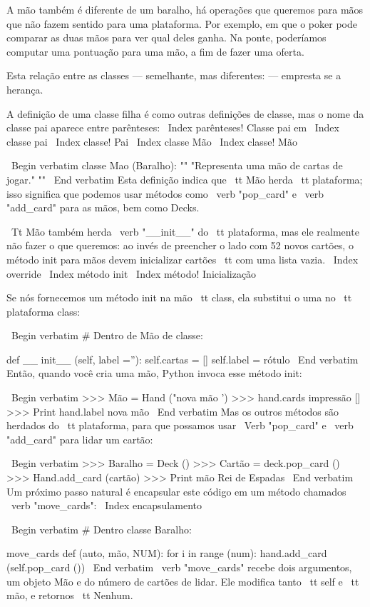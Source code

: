 \documentclass[10pt]{book}
\begin{document}
\begin {itemize}
{{{{{{{{{{{{{{{{A mão também é diferente de um baralho, há operações que queremos para
mãos que não fazem sentido para uma plataforma. Por exemplo, em que o poker
pode comparar as duas mãos para ver qual deles ganha. Na ponte, poderíamos
computar uma pontuação para uma mão, a fim de fazer uma oferta.

Esta relação entre as classes --- semelhante, mas diferentes: --- empresta
se a herança.  

A definição de uma classe filha é como outras definições de classe,
mas o nome da classe pai aparece entre parênteses:
\ Index {parênteses! Classe pai em}
\ Index {classe pai}
\ Index {classe! Pai}
\ Index {classe Mão}
\ Index {classe! Mão}

\ Begin {verbatim}
classe Mao (Baralho):
    "" "Representa uma mão de cartas de jogar." ""
\ End {verbatim}
%
Esta definição indica que {\ tt Mão} herda {\ tt plataforma};
isso significa que podemos usar métodos como \ verb "pop_card" e \ verb "add_card"
para as mãos, bem como Decks.

{\ Tt Mão} também herda \ verb "__init__" do {\ tt plataforma}, mas
ele realmente não fazer o que queremos: ao invés de preencher o lado
com 52 novos cartões, o método init para mãos devem inicializar
{cartões \ tt} com uma lista vazia.
\ Index {override}
\ Index {método init}
\ Index {método! Inicialização}

Se nós fornecemos um método init na mão {\ tt} class, ela substitui o
uma no {\ tt plataforma} class:

\ Begin {verbatim}
# Dentro de Mão de classe:

    def __ init__ (self, label =''):
        self.cartas = []
        self.label = rótulo
\ End {verbatim}
%
Então, quando você cria uma mão, Python invoca esse método init:

\ Begin {verbatim}
>>> Mão = Hand ("nova mão ')
>>> hand.cards impressão
[]
>>> Print hand.label
nova mão
\ End {verbatim}
%
Mas os outros métodos são herdados do {\ tt plataforma}, para que possamos usar
\ Verb "pop_card" e \ verb "add_card" para lidar um cartão:

\ Begin {verbatim}
>>> Baralho = Deck ()
>>> Cartão = deck.pop_card ()
>>> Hand.add_card (cartão)
>>> Print mão
Rei de Espadas
\ End {verbatim}
%
Um próximo passo natural é encapsular este código em um método
chamados \ verb "move_cards":
\ Index {} encapsulamento

\ Begin {verbatim}
# Dentro classe Baralho:

    move_cards def (auto, mão, NUM):
        for i in range (num):
            hand.add_card (self.pop_card ())
\ End {verbatim}
%
\ verb "move_cards" recebe dois argumentos, um objeto Mão e do número de
cartões de lidar. Ele modifica tanto {\ tt self} e {\ tt mão}, e
retornos {\ tt Nenhum}.

}}}}}}}}}}}}}}}}
\end{itemize}
\end{document}

